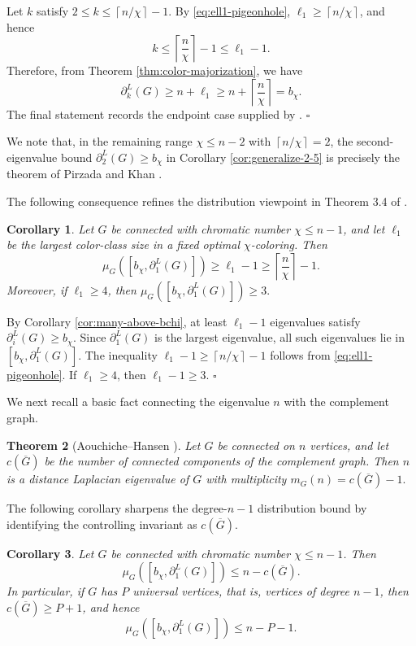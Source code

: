 \documentclass[12pt]{article}
\newcommand{\comp}[1]{\overline{#1}}
\newcommand{\ceil}[1]{\left\lceil #1 \right\rceil}
\theoremstyle{plain}
\newtheorem{theorem}{Theorem}[section]
\newtheorem{corollary}[theorem]{Corollary}
\theoremstyle{definition}
\renewenvironment{proof}{{\noindent\bfseries Proof. }}{\hfill$\square$\par}
\begin{document}
\begin{proof}
Let $k$ satisfy $2\le k\le \ceil{n/\chi}-1$. By \eqref{eq:ell1-pigeonhole},
$\ell_1\ge\ceil{n/\chi}$, and hence
\[
    k\le \ceil{\frac{n}{\chi}}-1\le \ell_1-1.
\]
Therefore, from Theorem \ref{thm:color-majorization}, we have
\[
    \partial_k^L(G)\ge n+\ell_1\ge n+\ceil{\frac{n}{\chi}}=b_\chi.
\]
The final statement records the endpoint case supplied by \cite{PirzadaKhan2021}.
\end{proof}

\medskip
\noindent We note that,  in the remaining range $\chi\le n-2$ with
$\ceil{n/\chi}=2$, the second-eigenvalue bound $\partial_2^L(G)\ge b_\chi$ in Corollary \ref{cor:generalize-2-5}  is precisely the theorem of Pirzada and Khan \cite{PirzadaKhan2021}.

\medskip 
\noindent  The following consequence refines the distribution viewpoint in Theorem 3.4 of \cite{PirzadaKhan2021}.

\begin{corollary}\label{cor:generalize-3-4}
Let $G$ be connected with chromatic number $\chi\le n-1$, and let $\ell_1$ be the largest color-class size in a fixed optimal
$\chi$-coloring. Then
\[
    \mu_G([b_\chi,\partial_1^L(G)])\ge \ell_1-1\ge \ceil{\frac{n}{\chi}}-1.
\]
Moreover, if $\ell_1\ge4$, then $\mu_G([b_\chi,\partial_1^L(G)])\ge3.$ 
\end{corollary}

\begin{proof}
By Corollary \ref{cor:many-above-bchi}, at least $\ell_1-1$ eigenvalues satisfy $\partial_i^L(G)\ge b_\chi$. Since
$\partial_1^L(G)$ is the largest eigenvalue, all such eigenvalues lie in $[b_\chi,\partial_1^L(G)]$. The inequality
$\ell_1-1\ge\ceil{n/\chi}-1$ follows from \eqref{eq:ell1-pigeonhole}. If $\ell_1\ge4$, then $\ell_1-1\ge3$.
\end{proof}

\medskip
\noindent We next recall a basic fact connecting the eigenvalue $n$ with the complement graph.

\begin{theorem}[Aouchiche--Hansen \cite{AouchicheHansen2013}]\label{thm:n-mult-complement}
Let $G$ be connected on $n$ vertices, and let $c(\comp{G})$ be the number of connected components of the complement graph.
Then $n$ is a distance Laplacian eigenvalue of $G$ with multiplicity
 $m_G(n)=c(\comp{G})-1.$ 
\end{theorem}

\noindent The following corollary sharpens the degree-$n-1$ distribution bound by identifying the controlling invariant as
$c(\comp{G})$.
\begin{corollary}\label{cor:upper-by-complement}
Let $G$ be connected with chromatic number $\chi\le n-1$. Then
\[
    \mu_G([b_\chi,\partial_1^L(G)])\le n-c(\comp{G}).
\]
In particular, if $G$ has $P$ universal vertices, that is, vertices of degree $n-1$, then $c(\comp{G})\ge P+1$, and hence
\[
    \mu_G([b_\chi,\partial_1^L(G)])\le n-P-1.
\]
\end{corollary}
\end{document}
